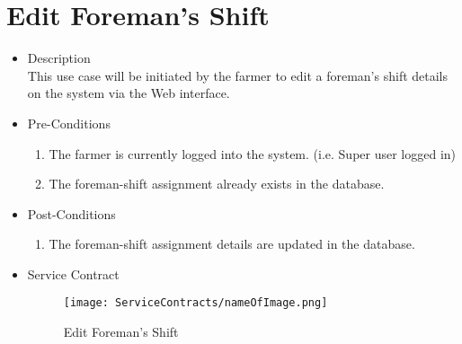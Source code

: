 \documentclass[11pt,fleqn]{book} %
\begin{document}
\section{Edit Foreman’s Shift}
\begin{itemize}
	\item Description\\
	This use case will be initiated by the farmer to edit a foreman’s shift details on the system via the Web interface.
	\item Pre-Conditions
	\begin{enumerate}
		\item The farmer is currently logged into the system. (i.e. Super user logged in)
		\item The foreman-shift assignment already exists in the database.	
	\end{enumerate}
	\item Post-Conditions
	\begin{enumerate}
		\item The foreman-shift assignment details are updated in the database.
	\end{enumerate}
	\item Service Contract
	\begin{figure}
		\texttt{[image: ServiceContracts/nameOfImage.png]}
		\caption{Edit Foreman’s Shift}
	\end{figure}
\end{itemize}
\end{document}
